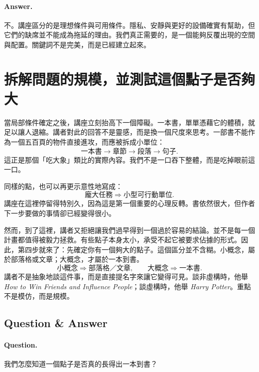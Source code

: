 \paragraph{Answer.} 不。講座區分的是理想條件與可用條件。隱私、安靜與更好的設備確實有幫助，但它們的缺席並不能成為拖延的理由。我們真正需要的，是一個能夠反覆出現的空間與配置。關鍵詞不是完美，而是已經建立起來。

\section{拆解問題的規模，並測試這個點子是否夠大}

當局部條件確定之後，講座立刻抬高下一個障礙。一本書，單單憑藉它的體積，就足以讓人退縮。講者對此的回答不是靈感，而是換一個尺度來思考。一部書不能作為一個五百頁的物件直接進攻，而應被拆成小單位：
\begin{equation}
\text{一本書} \to \text{章節} \to \text{段落} \to \text{句子}.
\end{equation}
這正是那個「吃大象」類比的實際內容。我們不是一口吞下整體，而是吃掉眼前這一口。

同樣的點，也可以再更示意性地寫成：
\begin{equation}
\text{龐大任務} \Rightarrow \text{小型可行動單位}.
\end{equation}
講座在這裡停留得特別久，因為這是第一個重要的心理反轉。書依然很大，但作者下一步要做的事情卻已經變得很小。

然而，到了這裡，講者又拒絕讓我們過早得到一個過於容易的結論。並不是每一個計畫都值得被毅力拯救。有些點子本身太小，承受不起它被要求佔據的形式。因此，第四步就來了：先確定你有一個夠大的點子。這個區分並不含糊。小概念，屬於部落格或文章；大概念，才屬於一本到書。
\begin{equation}
\text{小概念} \Rightarrow \text{部落格／文章}, \qquad
\text{大概念} \Rightarrow \text{一本書}.
\end{equation}
講者不是抽象地談這件事，而是直接提名字來讓它變得可見。談非虛構時，他舉 \textit{How to Win Friends and Influence People}；談虛構時，他舉 \textit{Harry Potter}。重點不是模仿，而是規模。

\subsection{Question \& Answer}

\paragraph{Question.} 我們怎麼知道一個點子是否真的長得出一本到書？

